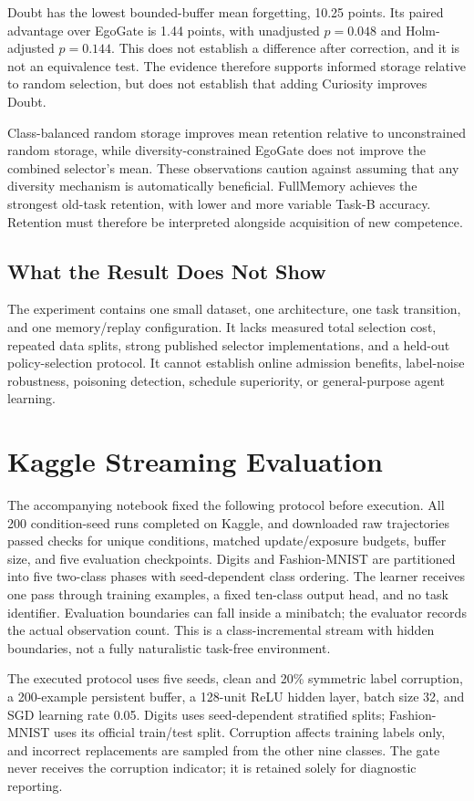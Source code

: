 \documentclass[conference]{IEEEtran}
\begin{document}
Doubt has the lowest bounded-buffer mean forgetting, 10.25 points. Its paired advantage over EgoGate is 1.44 points, with unadjusted $p=0.048$ and Holm-adjusted $p=0.144$. This does not establish a difference after correction, and it is not an equivalence test. The evidence therefore supports informed storage relative to random selection, but does not establish that adding Curiosity improves Doubt.

Class-balanced random storage improves mean retention relative to unconstrained random storage, while diversity-constrained EgoGate does not improve the combined selector's mean. These observations caution against assuming that any diversity mechanism is automatically beneficial. FullMemory achieves the strongest old-task retention, with lower and more variable Task-B accuracy. Retention must therefore be interpreted alongside acquisition of new competence.

\subsection{What the Result Does Not Show}
The experiment contains one small dataset, one architecture, one task transition, and one memory/replay configuration. It lacks measured total selection cost, repeated data splits, strong published selector implementations, and a held-out policy-selection protocol. It cannot establish online admission benefits, label-noise robustness, poisoning detection, schedule superiority, or general-purpose agent learning.

\section{Kaggle Streaming Evaluation}
The accompanying notebook fixed the following protocol before execution. All 200 condition-seed runs completed on Kaggle, and downloaded raw trajectories passed checks for unique conditions, matched update/exposure budgets, buffer size, and five evaluation checkpoints. Digits and Fashion-MNIST \cite{fashion} are partitioned into five two-class phases with seed-dependent class ordering. The learner receives one pass through training examples, a fixed ten-class output head, and no task identifier. Evaluation boundaries can fall inside a minibatch; the evaluator records the actual observation count. This is a class-incremental stream with hidden boundaries, not a fully naturalistic task-free environment.

The executed protocol uses five seeds, clean and 20\% symmetric label corruption, a 200-example persistent buffer, a 128-unit ReLU hidden layer, batch size 32, and SGD learning rate 0.05. Digits uses seed-dependent stratified splits; Fashion-MNIST uses its official train/test split. Corruption affects training labels only, and incorrect replacements are sampled from the other nine classes. The gate never receives the corruption indicator; it is retained solely for diagnostic reporting.
\end{document}
